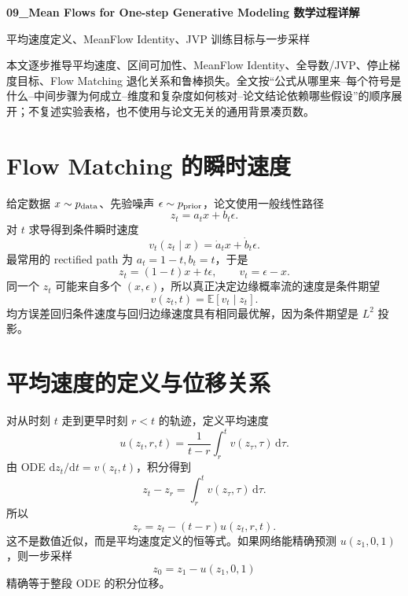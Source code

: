\documentclass[UTF8,12pt,a4paper,fontset=none]{ctexart}
\numberwithin{equation}{section}
\newcommand{\E}{\mathbb{E}}
\newcommand{\dd}{\mathrm{d}}
\begin{document}
\begin{center}
{\LARGE\bfseries 09\_Mean Flows for One-step Generative Modeling 数学过程详解}\par
\vspace{0.35em}
{\large 平均速度定义、MeanFlow Identity、JVP 训练目标与一步采样}
\end{center}
\vspace{0.45em}
\begin{keybox}[本文只处理真正需要推导的部分]
本文逐步推导平均速度、区间可加性、MeanFlow Identity、全导数/JVP、停止梯度目标、Flow Matching 退化关系和鲁棒损失。全文按“公式从哪里来--每个符号是什么--中间步骤为何成立--维度和复杂度如何核对--论文结论依赖哪些假设”的顺序展开；不复述实验表格，也不使用与论文无关的通用背景凑页数。
\end{keybox}
\tableofcontents
\newpage

\section{Flow Matching 的瞬时速度}
给定数据 $x\sim p_{\rm data}$、先验噪声 $\epsilon\sim p_{\rm prior}$，论文使用一般线性路径
\begin{equation}
 z_t=a_t x+b_t\epsilon.
\end{equation}
对 $t$ 求导得到条件瞬时速度
\begin{equation}
 v_t(z_t\mid x)=\dot a_t x+\dot b_t\epsilon.
\end{equation}
最常用的 rectified path 为 $a_t=1-t,b_t=t$，于是
\begin{equation}
 z_t=(1-t)x+t\epsilon,\qquad v_t=\epsilon-x.
\end{equation}
同一个 $z_t$ 可能来自多个 $(x,\epsilon)$，所以真正决定边缘概率流的速度是条件期望
\begin{equation}
 \boxed{v(z_t,t)=\E[v_t\mid z_t].}
\end{equation}
均方误差回归条件速度与回归边缘速度具有相同最优解，因为条件期望是 $L^2$ 投影。

\section{平均速度的定义与位移关系}
对从时刻 $t$ 走到更早时刻 $r<t$ 的轨迹，定义平均速度
\begin{equation}
 \boxed{u(z_t,r,t)=\frac{1}{t-r}\int_r^t v(z_\tau,\tau)\,\dd\tau.}
\end{equation}
由 ODE $\dd z_t/\dd t=v(z_t,t)$，积分得到
\begin{equation}
 z_t-z_r=\int_r^t v(z_\tau,\tau)\,\dd\tau.
\end{equation}
所以
\begin{equation}
 \boxed{z_r=z_t-(t-r)u(z_t,r,t).}
\end{equation}
这不是数值近似，而是平均速度定义的恒等式。如果网络能精确预测 $u(z_1,0,1)$，则一步采样
\begin{equation}
 z_0=z_1-u(z_1,0,1)
\end{equation}
精确等于整段 ODE 的积分位移。
\end{document}

